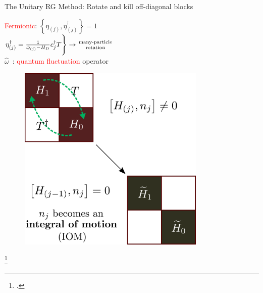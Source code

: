 \documentclass[11pt,aspectratio=169]{beamer}
\newcommand{\focus}[1]{\textcolor{red}{#1}}
\begin{document}
\begin{frame}{The Unitary RG Method: Rotate and kill off-diagonal blocks}

\vspace*{\fill}

\begin{minipage}{0.5\textwidth}
\centering
\focus{Fermionic}: \(\left\{\eta_{(j)}, \eta^\dagger_{(j)}\right\} = 1 \)\\[20pt]
\( \eta^\dagger_{(j)} = \frac{1}{\hat \omega_{(j)} - H_D}c^\dagger_j T \Bigg \} \rightarrow {\text{many-particle}\atop{\text{rotation}}}\)\\[20pt]
\(\hat \omega\)~: \focus{quantum fluctuation} operator
\vspace*{\fill}
\end{minipage}
\hspace*{\fill}
\begin{minipage}{0.45\textwidth}
\begin{figure}
	\includegraphics[width=0.8\textwidth]{figures/urg_rot.pdf}
\end{figure}
\end{minipage}

\footcite{anirbanurg1,anirbanurg2}
\end{frame}
\end{document}
